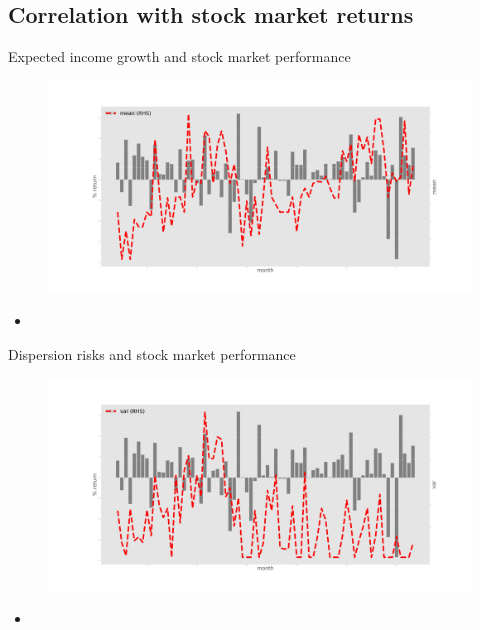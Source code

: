 \documentclass{beamer}
\begin{document}
\subsection{Correlation with stock market returns}

\begin{frame}{Expected income growth and stock market performance}
		\begin{figure}
		\centering
		\label{ts_mean}
		\includegraphics[width=\textwidth]{figures/tsMedmean.jpg}
	\end{figure}
	\begin{itemize}
		\item 
	\end{itemize}
\end{frame}


\begin{frame}{Dispersion risks and stock market performance}
	\begin{figure}
		\centering
		\label{ts_var}
		\includegraphics[width=\textwidth]{figures/tsMedvar.jpg}
	\end{figure}
	\begin{itemize}
		\item 
	\end{itemize}
\end{frame}
\end{document}
